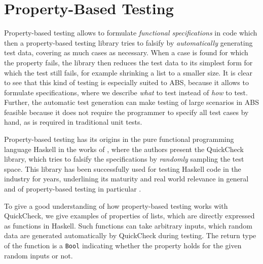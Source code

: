 \section{Property-Based Testing}
\label{sec:proptesting}
Property-based testing allows to formulate \textit{functional specifications} in code which then a property-based testing library tries to falsify by \textit{automatically} generating test data, covering as much cases as necessary. When a case is found for which the property fails, the library then reduces the test data to its simplest form for which the test still fails, for example shrinking a list to a smaller size. It is clear to see that this kind of testing is especially suited to ABS, because it allows to formulate specifications, where we describe \textit{what} to test instead of \textit{how} to test. %
Further, the automatic test generation can make testing of large scenarios in ABS feasible because it does not require the programmer to specify all test cases by hand, as is required in traditional unit tests.

Property-based testing has its origins in the pure functional programming language Haskell in the works of \cite{claessen_quickcheck_2000,claessen_testing_2002}, where the authors present the QuickCheck library, which tries to falsify the specifications by \textit{randomly} sampling the test space. This library has been successfully used for testing Haskell code in the industry for years, underlining its maturity and real world relevance in general and of property-based testing in particular \cite{hughes_quickcheck_2007}.



To give a good understanding of how property-based testing works with \\ QuickCheck, we give examples of properties of lists, which are directly expressed as functions in Haskell. Such functions can take arbitrary inputs, which random data are generated automatically by QuickCheck during testing. The return type of the function is a \texttt{Bool} indicating whether the property holds for the given random inputs or not.

